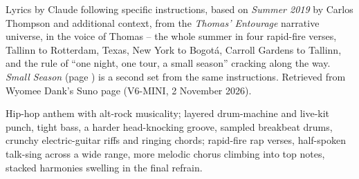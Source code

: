 
\label{sec:a-small-season}
\begin{notes}
Lyrics by Claude following specific instructions, based on \emph{Summer 2019} by Carlos Thompson and additional context, from the \emph{Thomas' Entourage} narrative universe, in the voice of Thomas -- the whole summer in four rapid-fire verses, Tallinn to Rotterdam, Texas, New York to Bogotá, Carroll Gardens to Tallinn, and the rule of ``one night, one tour, a small season'' cracking along the way. \emph{Small Season} (page \pageref{sec:small-season}) is a second set from the same instructions. Retrieved from Wyomee Dank's Suno page (V6-MINI, 2 November 2026).
\end{notes}
\begin{style}
Hip-hop anthem with alt-rock musicality; layered drum-machine and live-kit punch, tight bass, a harder head-knocking groove, sampled breakbeat drums, crunchy electric-guitar riffs and ringing chords; rapid-fire rap verses, half-spoken talk-sing across a wide range, more melodic chorus climbing into top notes, stacked harmonies swelling in the final refrain.
\end{style}
